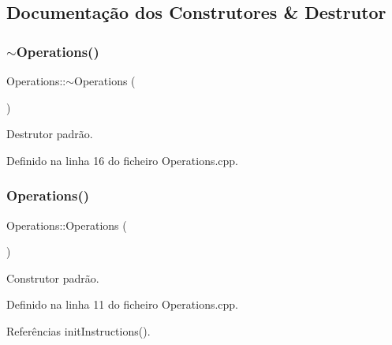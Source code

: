 \subsection{Documentação dos Construtores \& Destrutor}
\mbox{\label{classOperations_acfd66736f28837cca7379254a6eb988c}} 
\subsubsection{\texorpdfstring{$\sim$\+Operations()}{~Operations()}}
{\footnotesize\ttfamily Operations\+::$\sim$\+Operations (\begin{DoxyParamCaption}{ }\end{DoxyParamCaption})}



Destrutor padrão. 



Definido na linha 16 do ficheiro Operations.\+cpp.

\mbox{\label{classOperations_af344ca561c1a08118f686551abb08efb}} 
\subsubsection{\texorpdfstring{Operations()}{Operations()}\hspace{0.1cm}{\footnotesize\ttfamily [1/2]}}
{\footnotesize\ttfamily Operations\+::\+Operations (\begin{DoxyParamCaption}{ }\end{DoxyParamCaption})\hspace{0.3cm}{\ttfamily [private]}}



Construtor padrão. 



Definido na linha 11 do ficheiro Operations.\+cpp.



Referências init\+Instructions().

